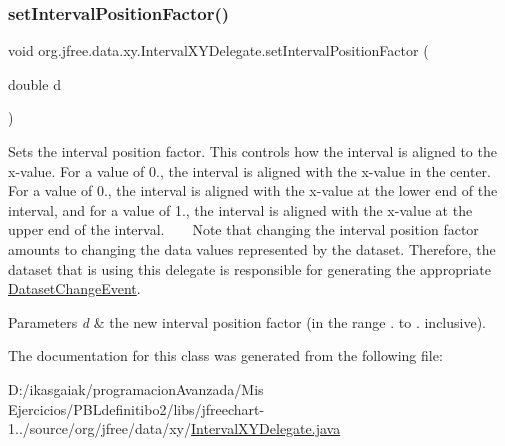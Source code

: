 \subsubsection{\texorpdfstring{set\+Interval\+Position\+Factor()}{setIntervalPositionFactor()}}
{\footnotesize\ttfamily void org.\+jfree.\+data.\+xy.\+Interval\+X\+Y\+Delegate.\+set\+Interval\+Position\+Factor (\begin{DoxyParamCaption}\item[{double}]{d }\end{DoxyParamCaption})}

Sets the interval position factor. This controls how the interval is aligned to the x-\/value. For a value of 0., the interval is aligned with the x-\/value in the center. For a value of 0., the interval is aligned with the x-\/value at the lower end of the interval, and for a value of 1., the interval is aligned with the x-\/value at the upper end of the interval. ~\newline
~\newline
 Note that changing the interval position factor amounts to changing the data values represented by the dataset. Therefore, the dataset that is using this delegate is responsible for generating the appropriate \mbox{\hyperlink{}{Dataset\+Change\+Event}}.


\begin{DoxyParams}{Parameters}
{\em d} & the new interval position factor (in the range {.} to {.} inclusive). \\
\hline
\end{DoxyParams}


The documentation for this class was generated from the following file\+:\begin{DoxyCompactItemize}
\item 
D\+:/ikasgaiak/programacion\+Avanzada/\+Mis Ejercicios/\+P\+B\+Ldefinitibo2/libs/jfreechart-\/1../source/org/jfree/data/xy/\mbox{\hyperlink{_interval_x_y_delegate_8java}{Interval\+X\+Y\+Delegate.\+java}}\end{DoxyCompactItemize}
